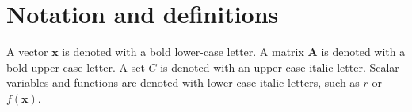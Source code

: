\documentclass[journal]{IEEEtran}
\begin{document}



\section{Notation and definitions} \label{notations}

A vector  $\mathbf{x}$ is denoted with a bold lower-case letter.
A matrix $\mathbf{A}$ is denoted with a bold upper-case letter.
A set $C$ is denoted with an upper-case italic letter.
Scalar variables and functions are denoted with lower-case italic letters, such as
$r$ or $f(\textbf{x})$.


\end{document}
